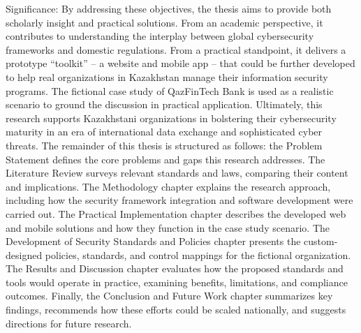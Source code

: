 Significance: By addressing these objectives, the thesis aims to provide both scholarly insight and practical solutions. From an academic perspective, it contributes to understanding the interplay between global cybersecurity frameworks and domestic regulations. From a practical standpoint, it delivers a prototype “toolkit” – a website and mobile app – that could be further developed to help real organizations in Kazakhstan manage their information security programs. The fictional case study of QazFinTech Bank is used as a realistic scenario to ground the discussion in practical application. Ultimately, this research supports Kazakhstani organizations in bolstering their cybersecurity maturity in an era of international data exchange and sophisticated cyber threats.
The remainder of this thesis is structured as follows: the Problem Statement defines the core problems and gaps this research addresses. The Literature Review surveys relevant standards and laws, comparing their content and implications. The Methodology chapter explains the research approach, including how the security framework integration and software development were carried out. The Practical Implementation chapter describes the developed web and mobile solutions and how they function in the case study scenario. The Development of Security
Standards and Policies chapter presents the custom-designed policies, standards, and control mappings for the fictional organization. The Results and Discussion chapter evaluates how the proposed standards and tools would operate in practice, examining benefits, limitations, and compliance outcomes. Finally, the Conclusion and Future Work chapter summarizes key findings, recommends how these efforts could be scaled nationally, and suggests directions for future research.


%
%

